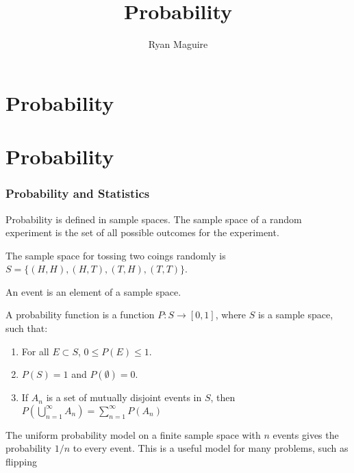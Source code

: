 \documentclass[crop=false,class=book,oneside]{standalone}
\begin{document}
    \ifx\ifmain\undefined
        \title{Probability}
        \author{Ryan Maguire}
        \date{\vspace{-5ex}}
        \maketitle
        \tableofcontents
        \chapter*{Probability}
        \setcounter{chapter}{1}
    \else
        \chapter{Probability}
    \fi
    \subsection{Probability and Statistics}
        Probability is defined in sample spaces. The sample space of
        a random experiment is the set of all
        possible outcomes for the experiment.
        \begin{example}
            The sample space for tossing two coings randomly is
            $S=\{(H,H),(H,T),(T,H),(T,T)\}$.
        \end{example}
        \begin{definition}
            An event is an element of a sample space.
        \end{definition}
        \begin{definition}
            A probability function is a function
            $P:S\rightarrow[0,1]$, where $S$ is a sample
            space, such that:
            \begin{enumerate}
                \item For all $E\subset{S}$, $0\leq{P(E)}\leq{1}$.
                \item $P(S)=1$ and $P(\emptyset)=0$.
                \item If $A_{n}$ is a set of mutually disjoint
                      events in $S$, then
                      $P(\bigcup_{n=1}^{\infty}A_{n})%
                       =\sum_{n=1}^{\infty}P(A_{n})$
            \end{enumerate}
        \end{definition}
        The uniform probability model on a finite sample space with
        $n$ events gives the probability $1/n$ to every event.
        This is a useful model for many problems, such as flipping
\end{document}
